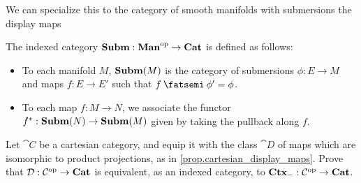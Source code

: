 \documentclass[DynamicalBook]{subfiles}
\begin{document}
We can specialize this to the category of smooth manifolds with submersions the
display maps
\begin{definition}
The indexed category $\textbf{Subm} : \textbf{Man}^{\textnormal{op}} \to \textbf{Cat}$ is defined as follows:
\begin{itemize}
  \item To each manifold $M$, $\textbf{Subm}(M)$ is the category of submersions
    $\phi : E \to M$ and maps $f : E \to E'$ such that $f \then \phi' = \phi$.
  \item To each map $f : M \to N$, we associate the functor $f^{\ast} :
    \textbf{Subm}(N) \to \textbf{Subm}(M)$ given by taking the pullback along $f$.
\end{itemize}
\end{definition}

\begin{exercise}
 Let $\cat{C}$ be a cartesian category, and equip it with the class $\cat{D}$ of maps
 which are isomorphic to product projections, as in
 \cref{prop.cartesian_display_maps}. Prove that $\mathcal{D} : \mathcal{C}^{\textnormal{op}} \to
 \textbf{Cat}$ is equivalent, as an indexed category, to $\textbf{Ctx}_{-} : \mathcal{C}^{\textnormal{op}}
 \to \textbf{Cat}$.
\end{exercise}
\end{document}
